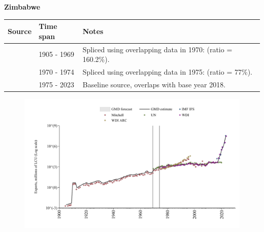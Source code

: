 \documentclass[12pt,a4paper,landscape]{article}
\begin{document}
\begin{adjustbox}{max totalsize={\paperwidth}{\paperheight},center}
\begin{minipage}[t][\textheight][t]{\textwidth}
\vspace*{0.5cm}
{}
\begin{center}
{\Large\bfseries Zimbabwe}
\end{center}
\vspace{0.5cm}
\begin{table}[H]
\centering
\small
\begin{tabular}{|l|l|l|}
\hline
\textbf{Source} & \textbf{Time span} & \textbf{Notes} \\
\hline
\rowcolor{white}\cite{Mitchell}& 1905 - 1969 &Spliced using overlapping data in 1970: (ratio = 160.2\%).\\
\rowcolor{lightgray}\cite{UN}& 1970 - 1974 &Spliced using overlapping data in 1975: (ratio = 77\%).\\
\rowcolor{white}\cite{WDI}& 1975 - 2023 &Baseline source, overlaps with base year 2018.\\
\hline
\end{tabular}
\end{table}
\begin{figure}[H]
\centering
\includegraphics[width=\textwidth,height=0.6\textheight,keepaspectratio]{graphs/ZWE_exports.pdf}
\end{figure}
\end{minipage}
\end{adjustbox}
\end{document}
